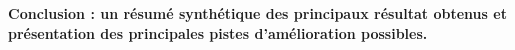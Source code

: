 
\textbf{Conclusion : un résumé synthétique des principaux résultat obtenus et présentation des principales pistes d'amélioration possibles.} \\

\lipsum[7]